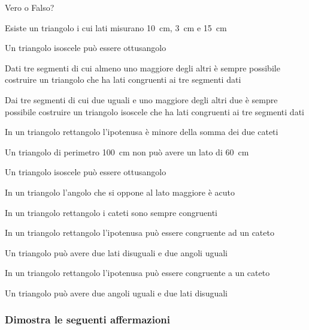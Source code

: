 \begin{esercizio}
\label{ese:3.79}
Vero o Falso? 
\begin{enumeratea}
\item Esiste un triangolo i cui lati misurano 10~cm, 3~cm e 15~cm\hfill\boxV\quad\boxF
\item Un triangolo isoscele può essere ottusangolo\hfill\boxV\quad\boxF
\item Dati tre segmenti di cui almeno uno maggiore degli altri è sempre possibile costruire un triangolo che ha lati congruenti ai tre segmenti dati\hfill\boxV\quad\boxF
\item Dai tre segmenti di cui due uguali e uno maggiore degli altri due è sempre possibile costruire un triangolo isoscele che ha lati congruenti ai tre segmenti dati\hfill\boxV\quad\boxF
\item In un triangolo rettangolo l'ipotenusa è minore della somma dei due cateti\hfill\boxV\quad\boxF
\item Un triangolo di perimetro 100~cm non può avere un lato di 60~cm\hfill\boxV\quad\boxF
\item Un triangolo isoscele può essere ottusangolo\hfill\boxV\quad\boxF
\item In un triangolo l'angolo che si oppone al lato maggiore è acuto\hfill\boxV\quad\boxF
\item In un triangolo rettangolo i cateti sono sempre congruenti\hfill\boxV\quad\boxF
\item In un triangolo rettangolo l'ipotenusa può essere congruente ad un cateto\hfill\boxV\quad\boxF
\item Un triangolo può avere due lati disuguali e due angoli uguali\hfill\boxV\quad\boxF
\item In un triangolo rettangolo l'ipotenusa può essere congruente a un cateto\hfill\boxV\quad\boxF
\item Un triangolo può avere due angoli uguali e due lati disuguali\hfill\boxV\quad\boxF
\end{enumeratea}
\end{esercizio}

\subsubsection*{Dimostra le seguenti affermazioni}

